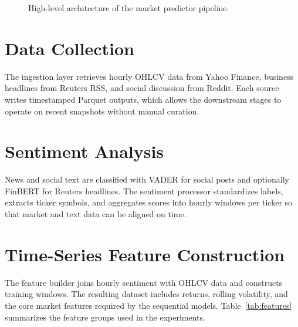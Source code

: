 \documentclass[conference]{IEEEtran}
\begin{document}
\begin{figure}[t]
\centering
{}
\caption{High-level architecture of the market predictor pipeline.}
\end{figure}

\section{Data Collection}
The ingestion layer retrieves hourly OHLCV data from Yahoo Finance, business headlines from Reuters RSS, and social discussion from Reddit. Each source writes timestamped Parquet outputs, which allows the downstream stages to operate on recent snapshots without manual curation.

\section{Sentiment Analysis}
News and social text are classified with VADER for social posts and optionally FinBERT for Reuters headlines. The sentiment processor standardizes labels, extracts ticker symbols, and aggregates scores into hourly windows per ticker so that market and text data can be aligned on time.

\section{Time-Series Feature Construction}
The feature builder joins hourly sentiment with OHLCV data and constructs training windows. The resulting dataset includes returns, rolling volatility, and the core market features required by the sequential models. Table~\ref{tab:features} summarizes the feature groups used in the experiments.
\end{document}
